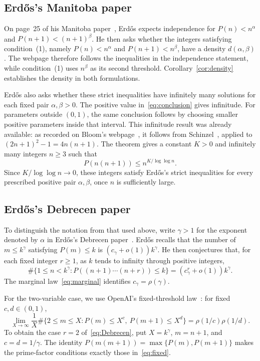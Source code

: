 \documentclass[11pt,a4paper]{amsart}
\begin{document}
\subsection{Erd\H{o}s's Manitoba paper}
On page~25 of his Manitoba paper~\cite{Erdos1976Manitoba},
Erd\H{o}s expects independence for $P(n)<n^\alpha$ and
$P(n+1)<(n+1)^\beta$. He then asks whether the integers satisfying
condition~(1), namely
$P(n)<n^\alpha$ and $P(n+1)<n^\beta$, have a density $d(\alpha,\beta)$.
The webpage therefore follows the inequalities in the independence
statement, while condition~(1) uses $n^\beta$ as its second threshold.
Corollary~\ref{cor:density} establishes the density in both formulations.

Erd\H{o}s also asks whether these strict inequalities have infinitely
many solutions for each fixed pair $\alpha,\beta>0$. The positive
value in~\eqref{eq:conclusion} gives infinitude. For parameters outside
$(0,1)$, the same conclusion follows by choosing smaller positive
parameters inside that interval.
This infinitude result was already available: as recorded on Bloom's
webpage~\cite{Bloom928}, it follows from
Schinzel~\cite[Theorem~14, p.~231]{Schinzel1967}, applied to
$(2n+1)^2-1=4n(n+1)$. The theorem gives a constant $K>0$ and infinitely
many integers $n\ge3$ such that
\[
 P(n(n+1))\le n^{K/\log\log n}.
\]
Since $K/\log\log n\to0$, these integers satisfy Erd\H{o}s's strict
inequalities for every prescribed positive pair $\alpha,\beta$, once
$n$ is sufficiently large.

\subsection{Erd\H{o}s's Debrecen paper}\label{subsec:debrecen}
To distinguish the notation from that used above, write $\gamma>1$
for the exponent denoted by $\alpha$ in Erd\H{o}s's Debrecen
paper~\cite[pp.~272--273]{Erdos1976Debrecen}. Erd\H{o}s recalls that the
number of $m\le k^\gamma$ satisfying $P(m)\le k$ is
$(c_\gamma+o(1))k^\gamma$. He then conjectures that, for each fixed integer
$r\ge1$, as $k$ tends to infinity through positive integers,
\begin{equation}\label{eq:Debrecen}
 \#\{1\le n<k^\gamma:P((n+1)\cdots(n+r))\le k\}
  =(c_\gamma^r+o(1))k^\gamma.
\end{equation}
The marginal law~\eqref{eq:marginal} identifies $c_\gamma=\rho(\gamma)$.

For the two-variable case, we use OpenAI's fixed-threshold
law~\cite[(11.7), p.~80]{OpenAI2026}: for fixed $c,d\in(0,1)$,
\begin{equation}\label{eq:fixed}
 \lim_{X\to\infty}\frac1X
 \#\{2\le m\le X:P(m)\le X^c,\ P(m+1)\le X^d\}
 =\rho(1/c)\rho(1/d).
\end{equation}
To obtain the case $r=2$ of~\eqref{eq:Debrecen}, put $X=k^\gamma$,
$m=n+1$, and $c=d=1/\gamma$. The identity
$P(m(m+1))=\max\{P(m),P(m+1)\}$ makes the prime-factor conditions
exactly those in~\eqref{eq:fixed}.
\end{document}
